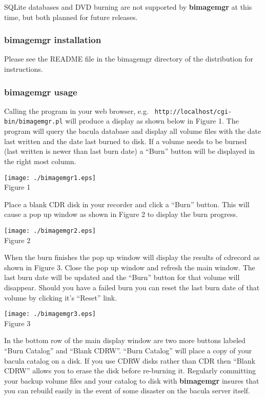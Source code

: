 SQLite databases and DVD burning are not supported by {\bf bimagemgr} at this
time, but both planned for future releases. 

\subsubsection*{bimagemgr installation}

Please see the README file in the bimagemgr directory of the distribution for
instructions. 

\subsubsection*{bimagemgr usage}

Calling the program in your web browser, e.g. {\tt
http://localhost/cgi-bin/bimagemgr.pl} will produce a display as shown below
in Figure 1. The program will query the bacula database and display all volume
files with the date last written and the date last burned to disk. If a volume
needs to be burned (last written is newer than last burn date) a ``Burn''
button will be displayed in the right most column. 

\texttt{[image: ./bimagemgr1.eps]} \\Figure 1 

Place a blank CDR disk in your recorder and click a ``Burn'' button. This will
cause a pop up window as shown in Figure 2 to display the burn progress. 

\texttt{[image: ./bimagemgr2.eps]} \\Figure 2 

When the burn finishes the pop up window will display the results of cdrecord
as shown in Figure 3. Close the pop up window and refresh the main window. The
last burn date will be updated and the ``Burn'' button for that volume will
disappear. Should you have a failed burn you can reset the last burn date of
that volume by clicking it's ``Reset'' link. 

\texttt{[image: ./bimagemgr3.eps]} \\Figure 3 

In the bottom row of the main display window are two more buttons labeled
``Burn Catalog'' and ``Blank CDRW''. ``Burn Catalog'' will place a copy of
your bacula catalog on a disk. If you use CDRW disks rather than CDR then
``Blank CDRW'' allows you to erase the disk before re-burning it. Regularly
committing your backup volume files and your catalog to disk with {\bf
bimagemgr} insures that you can rebuild easily in the event of some disaster
on the bacula server itself. 
